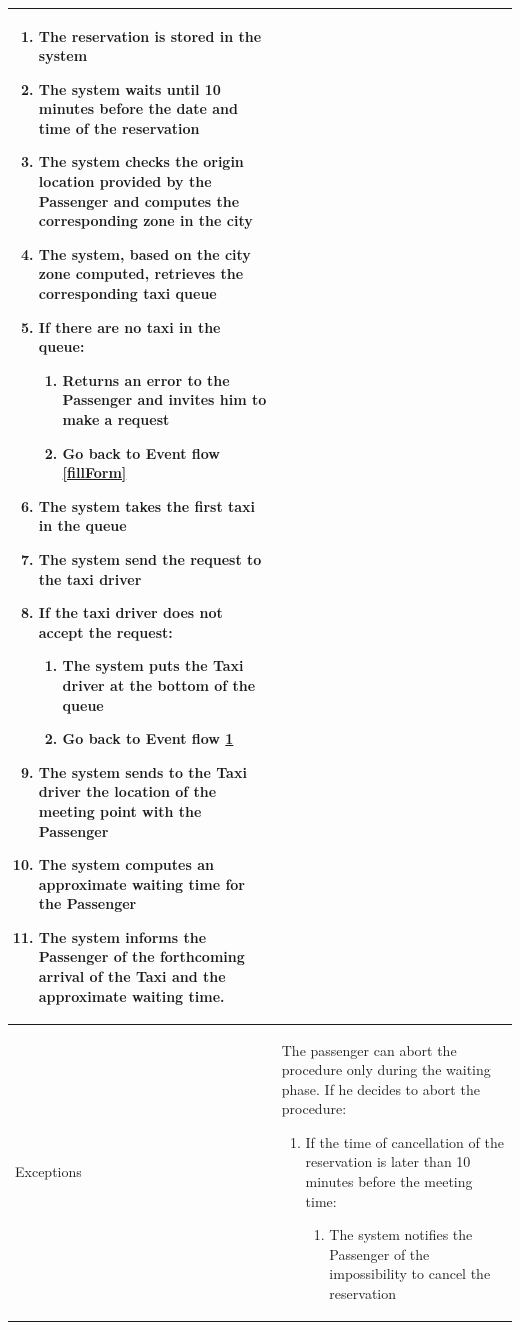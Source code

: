 \begin{center}
\begin{longtable}{| p{} | p{} |}
\begin{enumerate}
			\item The reservation is stored in the system
			\item The system waits until 10 minutes before the date and time of the reservation
			\item The system checks the origin location provided by the Passenger and computes the corresponding zone in the city
			\item The system, based on the city zone computed, retrieves the corresponding taxi queue
			\item If there are no taxi in the queue: \label{noTaxi}
			\begin{enumerate}
				\item Returns an error to the Passenger and invites him to make a request
				\item Go back to Event flow \ref{fillForm}
			\end{enumerate}
			\item The system takes the first taxi in the queue
			\item The system send the request to the taxi driver
			\item If the taxi driver does not accept the request:
			\begin{enumerate}
				\item The system puts the Taxi driver at the bottom of the queue
				\item Go back to Event flow \ref{noTaxi}
			\end{enumerate}
			\item The system sends to the Taxi driver the location of the meeting point with the Passenger
			\item The system computes an approximate waiting time for the Passenger
			\item The system informs the Passenger of the forthcoming arrival of the Taxi and the approximate waiting time.
		\end{enumerate} \\ \hline
		Exceptions & The passenger can abort the procedure only during the	waiting phase. If he decides to abort the procedure:
		\begin{enumerate}
		\item If the time of cancellation of the reservation is later than 10 minutes before the meeting time:
		\begin{enumerate}
			\item The system notifies the Passenger of the impossibility to cancel the reservation
		\end{enumerate}

\end{enumerate}
\end{longtable}
\end{center}
